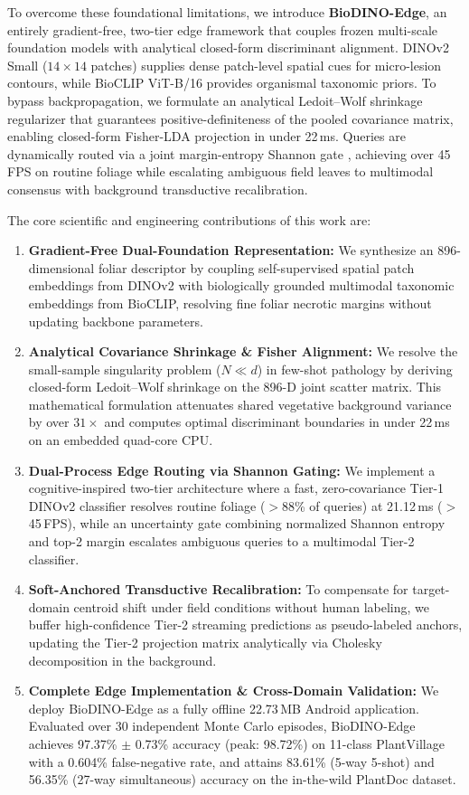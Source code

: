 \documentclass[a4paper,fleqn,nologo]{cas-dc}
\begin{document}
To overcome these foundational limitations, we introduce \textbf{BioDINO-Edge}, an entirely gradient-free, two-tier edge framework that couples frozen multi-scale foundation models with analytical closed-form discriminant alignment. DINOv2 Small ($14\times 14$ patches) \cite{oquab2023dinov2} supplies dense patch-level spatial cues for micro-lesion contours, while BioCLIP ViT-B/16 \cite{stevens2024bioclip} provides organismal taxonomic priors. To bypass backpropagation, we formulate an analytical Ledoit--Wolf shrinkage regularizer \cite{ledoit2004well} that guarantees positive-definiteness of the pooled covariance matrix, enabling closed-form Fisher-LDA projection in under 22\,ms. Queries are dynamically routed via a joint margin-entropy Shannon gate \cite{shannon1948mathematical}, achieving over 45\,FPS on routine foliage while escalating ambiguous field leaves to multimodal consensus with background transductive recalibration.

The core scientific and engineering contributions of this work are:
\begin{enumerate}
    \item \textbf{Gradient-Free Dual-Foundation Representation:} We synthesize an 896-dimensional foliar descriptor by coupling self-supervised spatial patch embeddings from DINOv2 with biologically grounded multimodal taxonomic embeddings from BioCLIP, resolving fine foliar necrotic margins without updating backbone parameters.
    \item \textbf{Analytical Covariance Shrinkage \& Fisher Alignment:} We resolve the small-sample singularity problem ($N \ll d$) in few-shot pathology by deriving closed-form Ledoit--Wolf shrinkage on the 896-D joint scatter matrix. This mathematical formulation attenuates shared vegetative background variance by over $31\times$ and computes optimal discriminant boundaries in under 22\,ms on an embedded quad-core CPU.
    \item \textbf{Dual-Process Edge Routing via Shannon Gating:} We implement a cognitive-inspired two-tier architecture where a fast, zero-covariance Tier-1 DINOv2 classifier resolves routine foliage ($>$88\% of queries) at 21.12\,ms ($>$45\,FPS), while an uncertainty gate combining normalized Shannon entropy and top-2 margin escalates ambiguous queries to a multimodal Tier-2 classifier.
    \item \textbf{Soft-Anchored Transductive Recalibration:} To compensate for target-domain centroid shift under field conditions without human labeling, we buffer high-confidence Tier-2 streaming predictions as pseudo-labeled anchors, updating the Tier-2 projection matrix analytically via Cholesky decomposition in the background.
    \item \textbf{Complete Edge Implementation \& Cross-Domain Validation:} We deploy BioDINO-Edge as a fully offline 22.73\,MB Android application. Evaluated over 30 independent Monte Carlo episodes, BioDINO-Edge achieves 97.37\% $\pm$ 0.73\% accuracy (peak: 98.72\%) on 11-class PlantVillage with a 0.604\% false-negative rate, and attains 83.61\% (5-way 5-shot) and 56.35\% (27-way simultaneous) accuracy on the in-the-wild PlantDoc dataset.
\end{enumerate}
\end{document}
